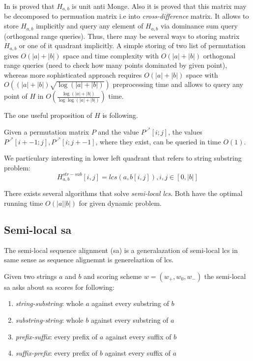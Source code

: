 In \cite{tiskin} is proved that $H_{a,b}$ is unit anti Monge.
Also it is proved that  this matrix may be decomposed to permuation matrix i.e into \emph{cross-difference} matrix.
It allows to store $H_{a,b}$ implicitly and query any element of $H_{a,b}$ via dominance sum query (orthogonal range queries).
Thus, there may be several ways to storing matrix $H_{a,b}$ or one of it quadrant implicitly.
A simple storing of two list of permutation gives $O(|a|+|b|)$
space and time complexity with $O(|a|+|b|)$ orthogonal range queries (need to check  how many points dominated by given point), whereas more sophisticated approach requires
$O(|a|+|b|)$  space with $O( (|a|+|b|) \sqrt{\log{ (|a| +|b|)} } )$ preprocessing time and allows to query any point of $H$ in $O(\frac{\log (|a|+|b|)}{\log \log (|a|+|b|)})$ time.  

The one useful proposition of $H$ is following.
\begin{proposition}\cite{}
Given a permutation matrix $P$ and the value
$P^{\nearrow}[i; j]$, the values $P^{\nearrow}[i +- 1; j], P^{\nearrow}[i; j +- 1]$, where they exist, can
be queried in time $O(1)$\cite{}.
\end{proposition}


We particulary interesting in lower left quadrant that refers to string substring problem:
\begin{equation}
H_{a,b}^{str-sub}[i,j] = lcs(a,b[i,j]),i,j \in [0,|b|] 
\end{equation}

There exists several algorithms  that solve \emph{semi-local lcs}.
Both have the optimal running time $O(|a||b|)$ for given dynamic problem\cite{}.

\subsection{Semi-local sa}
The semi-local sequence alignment (sa) is a generalazation of semi-local lcs in same sense as sequence alignemnt is generelaztion of lcs.

Given two strings $a$ and $b$ and scoring scheme $w=(w_{+},w_{0},w_{-})$  the semi-local sa  asks about
sa scores for following:
\begin{enumerate}
\item \emph{string-substring}: whole $a$ against every substring of $b$
\item \emph{substring-string}: whole $b$ against every substring of $a$
\item \emph{prefix-suffix}: every prefix of $a$ against every suffix of $b$
\item \emph{suffix-prefix}: every prefix of $b$ against every suffix of $a$
\end{enumerate} 

